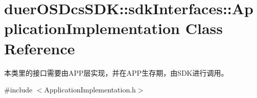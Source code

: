 \hypertarget{classduerOSDcsSDK_1_1sdkInterfaces_1_1ApplicationImplementation}{}\section{duer\+O\+S\+Dcs\+S\+DK\+:\+:sdk\+Interfaces\+:\+:Application\+Implementation Class Reference}
\label{classduerOSDcsSDK_1_1sdkInterfaces_1_1ApplicationImplementation}


本类里的接口需要由\+A\+P\+P层实现，并在\+A\+P\+P生存期，由\+S\+D\+K进行调用。  




{\ttfamily \#include $<$Application\+Implementation.\+h$>$}

